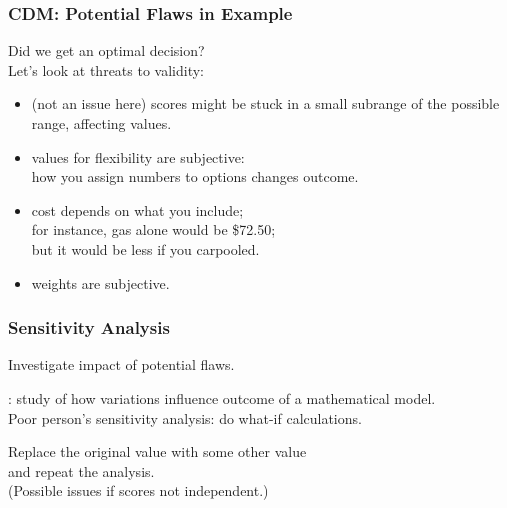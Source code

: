 \begin{frame}
\frametitle{CDM: Potential Flaws in Example}

\begin{changemargin}{1cm}

Did we get an optimal decision? \\

Let's look at threats to validity:

\begin{itemize}
\item (not an issue here) scores might be stuck in a
small subrange of the possible range, affecting values.
\item values for flexibility are subjective:\\
how you assign numbers to options changes  outcome.
\item cost depends on what you include; \\
for instance, gas alone would be \$72.50; \\
but it would be less if you carpooled.
\item weights are subjective.
\end{itemize}

\end{changemargin}

\end{frame}

\begin{frame}
\frametitle{Sensitivity Analysis}

\begin{changemargin}{1cm}
Investigate impact of potential flaws.

: study of how variations
influence outcome of a mathematical model.\\[1.5em]

Poor person's sensitivity analysis: do what-if
calculations.

Replace the original value with some other value\\
and repeat the analysis. \\

(Possible issues if scores not independent.)

\end{changemargin}

\end{frame}

